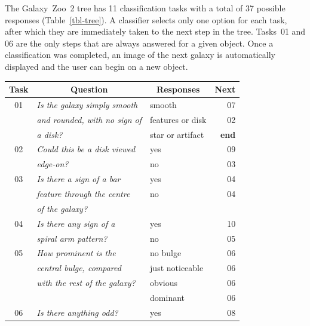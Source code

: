 \documentclass[useAMS,usenatbib]{mn2e}
\begin{document}
The Galaxy~Zoo~2 tree has 11 classification tasks with a total of 37 possible responses (Table~\ref{tbl-tree}). A classifier selects only one option for each task, after which they are immediately taken to the next step in the tree. Tasks~01 and 06 are the only steps that are always answered for a given object. Once a classification was completed, an image of the next galaxy is automatically displayed and the user can begin on a new object. 

\begin{table}
 \begin{tabular}{@{}cllr}
 \hline
\multicolumn{1}{l}{Task} &
\multicolumn{1}{c}{Question} &
\multicolumn{1}{c}{Responses} &
\multicolumn{1}{c}{Next} 
\\ 
\hline
\hline						%
01    & {\it Is the galaxy simply smooth   }  & smooth           & 07 \\
      & {\it and rounded, with no sign of  }  & features or disk & 02 \\
      & {\it a disk?                       }  & star or artifact & {\bf end} \\
      \hline
02    & {\it Could this be a disk viewed   }  & yes              & 09 \\
      & {\it edge-on?                      }  & no               & 03 \\
      \hline
03    & {\it Is there a sign of a bar      }  & yes              & 04 \\
      & {\it feature through the centre    }  & no               & 04 \\
      & {\it of the galaxy?                }                                        \\
      \hline
04    & {\it Is there any sign of a        }  & yes              & 10 \\
      & {\it spiral arm pattern?           }  & no               & 05 \\
      \hline
05    & {\it How prominent is the          }  & no bulge         & 06 \\
      & {\it central bulge, compared       }  & just noticeable  & 06 \\
      & {\it with the rest of the galaxy?  }  & obvious          & 06 \\
      & {\it                               }  & dominant         & 06 \\
      \hline
06    & {\it Is there anything odd?        }  & yes              & 08 \\ 

\end{tabular}
\end{table}
\end{document}
